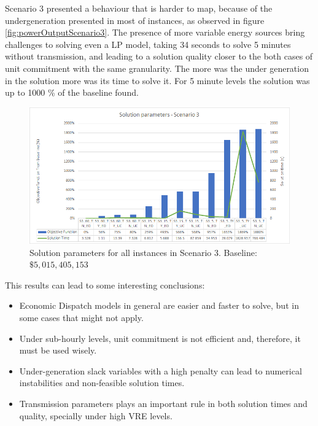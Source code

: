\documentclass[12pt,LUDisStyle,twosided]{book}
\begin{document}
Scenario 3 presented a behaviour that is harder to map, because of the undergeneration presented in most of instances, as observed in figure \ref{fig:powerOutputScenario3}. The presence of more variable energy sources bring challenges to solving even a LP model, taking 34 seconds to solve 5 minutes without transmission, and leading to a solution quality closer to the both cases of unit commitment with the same granularity. The more was the under generation in the solution more was its time to solve it. For 5 minute levels the solution was up to 1000 \% of the baseline found.

\begin{figure}[h] 
  \centering
  
	  \includegraphics[width=\textwidth,height=\textheight,keepaspectratio]{SolutionParametersS3.png}
  
  \caption{Solution parameters for all instances in Scenario 3. Baseline: $\$5,015,405,153$}
  \label{fig:solutionparameterss3}
\end{figure}


This results can lead to some interesting conclusions:

\begin{itemize}
\item Economic Dispatch models in general are easier and faster to solve, but in some cases that might not apply.
\item Under sub-hourly levels, unit commitment is not efficient and, therefore, it must be used wisely.
\item Under-generation slack variables with a high penalty can lead to numerical instabilities and non-feasible solution times.
\item Transmission parameters plays an important rule in both solution times and quality, specially under high VRE levels.
\end{itemize}
\end{document}
